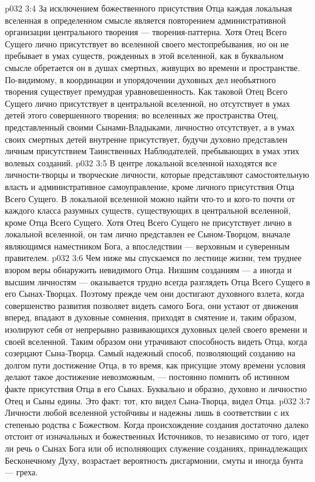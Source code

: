 \vs p032 3:4 \pc За исключением божественного присутствия Отца каждая локальная вселенная в определенном смысле является повторением административной организации центрального творения --- творения\hyp{}паттерна. Хотя Отец Всего Сущего лично присутствует во вселенной своего местопребывания, но он не пребывает в умах существ, рожденных в этой вселенной, как в буквальном смысле обретается он в душах смертных, живущих во времени и пространстве. По\hyp{}видимому, в координации и упорядочении духовных дел необъятного творения существует премудрая уравновешенность. Как таковой Отец Всего Сущего лично присутствует в центральной вселенной, но отсутствует в умах детей этого совершенного творения; во вселенных же пространства Отец, представленный своими Сынами\hyp{}Владыками, личностно отсутствует, а в умах своих смертных детей внутренне присутствует, будучи духовно представлен личным присутствием Таинственных Наблюдателей, пребывающих в умах этих волевых созданий.
\vs p032 3:5 В центре локальной вселенной находятся все личности\hyp{}творцы и творческие личности, которые представляют самостоятельную власть и административное самоуправление, кроме личного присутствия Отца Всего Сущего. В локальной вселенной можно найти что\hyp{}то и кого\hyp{}то почти от каждого класса разумных существ, существующих в центральной вселенной, кроме Отца Всего Сущего. Хотя Отец Всего Сущего не присутствует лично в локальной вселенной, он там лично представлен ее Сыном\hyp{}Творцом, вначале являющимся наместником Бога, а впоследствии --- верховным и суверенным правителем.
\vs p032 3:6 Чем ниже мы спускаемся по лестнице жизни, тем труднее взором веры обнаружить невидимого Отца. Низшим созданиям --- а иногда и высшим личностям --- оказывается трудно всегда разглядеть Отца Всего Сущего в его Сынах\hyp{}Творцах. Поэтому прежде чем они достигают духовного взлета, когда совершенство развития позволяет видеть самого Бога, они устают от движения вперед, впадают в духовные сомнения, приходят в смятение и, таким образом, изолируют себя от непрерывно развивающихся духовных целей своего времени и своей вселенной. Таким образом они утрачивают способность видеть Отца, когда созерцают Сына\hyp{}Творца. Самый надежный способ, позволяющий созданию на долгом пути достижение Отца, в то время, как присущие этому времени условия делают такое достижение невозможным, --- постоянно помнить об истинном факте присутствия Отца в его Сынах. Буквально и образно, духовно и личностно Отец и Сыны едины. Это факт: тот, кто видел Сына\hyp{}Творца, видел Отца.
\vs p032 3:7 \pc Личности любой вселенной устойчивы и надежны лишь в соответствии с их степенью родства с Божеством. Когда происхождение создания достаточно далеко отстоит от изначальных и божественных Источников, то независимо от того, идет ли речь о Сынах Бога или об исполняющих служение созданиях, принадлежащих Бесконечному Духу, возрастает вероятность дисгармонии, смуты и иногда бунта --- греха.
